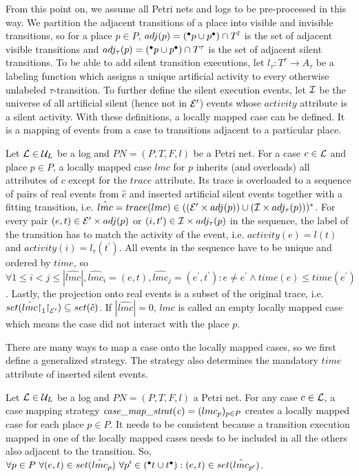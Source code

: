From this point on, we assume all Petri nets and logs to be pre-processed in this way.
We partition the adjacent transitions of a place into visible and invisible transitions, so for a place $p\in P$, $adj(p)=({^{\bullet}p} \cup p^{\bullet}) \cap T^{l}$ is the set of adjacent visible transitions and $adj_{\tau}(p) =({^{\bullet}p} \cup p^{\bullet}) \cap T^{\tau}$ is the set of adjacent silent transitions. To be able to add silent transition executions, let $l_{\tau}:T^{\tau} \to A_{\tau}$ be a labeling function which assigns a unique artificial activity to every otherwise unlabeled $\tau$-transition. To further define the silent execution events, let $\mathcal{I}$ be the universe of all artificial silent (hence not in $\mathcal{E}^\prime$) events whose $activity$ attribute is a silent activity. With these definitions, a locally mapped case can be defined. It is a mapping of events from a case to transitions adjacent to a particular place.
\begin{definition}
Let $\mathcal{L} \in \mathcal{U}_L$ be a log and $PN = (P,T,F,l)$ be a Petri net. For a case $c\in \mathcal{L}$ and place $p\in P$, a locally mapped case $lmc$ for $p$ inherits (and overloads) all attributes of $c$ except for the $trace$ attribute. Its trace is overloaded to a sequence of pairs of real events from $\hat{c}$ and inserted artificial silent events together with a fitting transition, i.e. $\hat{lmc}=trace(lmc)\in ((\mathcal{E}^\prime \times adj(p)) \cup (\mathcal{I} \times adj_{\tau}(p)))^*$. For every pair $(e,t)\in \mathcal{E}^\prime \times adj(p)$ or $(i,t^\prime)\in \mathcal{I} \times adj_{\tau}(p)$ in the sequence, the label of the transition has to match the activity of the event, i.e. $activity(e) = l(t)$ and $activity(i) = l_{\tau}(t^\prime)$. All events in the sequence have to be unique and ordered by $time$, so $\forall 1\le i<j \le |\hat{lmc}|, \hat{lmc}_i=(e,t), \hat{lmc}_j = (e^\prime,t^\prime): e\neq e^\prime \wedge time(e) \le time(e^\prime)$. Lastly, the projection onto real events is a subset of the original trace, i.e. $set(\hat{lmc}\mathord{\upharpoonright}_1\mathord{\upharpoonright}_{\mathcal{E}^\prime}) \subseteq set(\hat{c})$. If $|\hat{lmc}| = 0$, $lmc$ is called an empty locally mapped case which means the case did not interact with the place $p$.
\end{definition}
There are many ways to map a case onto the locally mapped cases, so we first define a generalized strategy. The strategy also determines the mandatory $time$ attribute of inserted silent events.
\begin{definition}
Let $\mathcal{L} \in \mathcal{U}_L$ be a log and $PN = (P,T,F,l)$ a Petri net. For any case $c\in \mathcal{L}$, a case mapping strategy $\mathit{case\_map\_strat(c)} = (lmc_p)_{p \in P}$ creates a locally mapped case for each place $p\in P$. It needs to be consistent because a transition execution mapped in one of the locally mapped cases needs to be included in all the others also adjacent to the transition. So, $\forall p\in P \ \forall (e,t) \in set(\hat{lmc}_p) \ \forall p^\prime \in ({^{\bullet}t} \cup t^{\bullet}): (e,t)\in set(\hat{lmc}_{p^\prime})$.
\end{definition}
